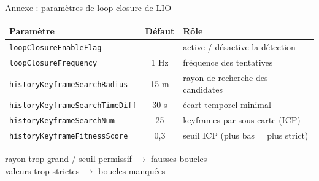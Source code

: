 
\begin{frame}{Annexe : paramètres de loop closure de LIO}
  \centering
  \small
  \begin{tabular}{@{}l c l@{}}
    \toprule
    \textbf{Paramètre} & \textbf{Défaut} & \textbf{Rôle} \\
    \midrule
    \texttt{loopClosureEnableFlag}         & --     & active / désactive la détection \\
    \texttt{loopClosureFrequency}          & 1 Hz   & fréquence des tentatives \\
    \texttt{historyKeyframeSearchRadius}   & 15 m   & rayon de recherche des candidates \\
    \texttt{historyKeyframeSearchTimeDiff} & 30 s   & écart temporel minimal \\
    \texttt{historyKeyframeSearchNum}      & 25     & keyframes par sous-carte (ICP) \\
    \texttt{historyKeyframeFitnessScore}   & 0,3    & seuil ICP (plus bas = plus strict) \\
    \bottomrule
  \end{tabular}\par
  \vspace{0.4cm}
  {\small rayon trop grand / seuil permissif $\rightarrow$ \alert{fausses boucles}\\[2pt]
   valeurs trop strictes $\rightarrow$ \alert{boucles manquées}\par}
\end{frame}

